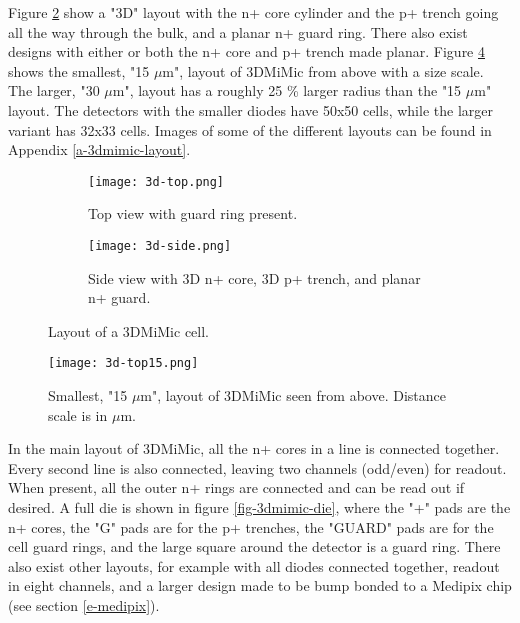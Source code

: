 \documentclass[../main/thesis.tex]{subfiles}
\begin{document}
Figure \ref{fig-3dmimic-side} show a "3D" layout with the n+ core cylinder and the p+ trench going all the way through the bulk, and a planar n+ guard ring. There also exist designs with either or both the n+ core and p+ trench made planar. Figure \ref{fig-3dmimic-top15} shows the smallest, "15 $\mu$m", layout of 3DMiMic from above with a size scale. The larger, "30 $\mu$m", layout has a roughly 25 \% larger radius than the "15 $\mu$m" layout. The detectors with the smaller diodes have 50x50 cells, while the larger variant has 32x33 cells. Images of some of the different layouts can be found in Appendix \ref{a-3dmimic-layout}.



\begin{figure}
	\centering
	\begin{subfigure}{.5\textwidth}
		\centering
		\texttt{[image: 3d-top.png]}
		\caption{Top view with guard ring present.}
		\label{fig-3dmimic-top}
	\end{subfigure}%
	\begin{subfigure}{.5\textwidth}
		\centering
		\texttt{[image: 3d-side.png]}
		\caption{Side view with 3D n+ core, 3D p+ trench, and planar n+ guard.}
		\label{fig-3dmimic-side} %
	\end{subfigure}
	\caption{Layout of a 3DMiMic cell. \citep{Marco}}
	\label{fig-3dmimic-top-side}
\end{figure}


\begin{figure}[h]
	\centering
	\texttt{[image: 3d-top15.png]}
	\caption{Smallest, "15 $\mu$m", layout of 3DMiMic seen from above. Distance scale is in $\mu$m. \citep{Marco}}
	\label{fig-3dmimic-top15} %
\end{figure}

In the main layout of 3DMiMic, all the n+ cores in a line is connected together. Every second line is also connected, leaving two channels (odd/even) for readout. When present, all the outer n+ rings are connected and can be read out if desired. A full die is shown in figure \ref{fig-3dmimic-die}, where the "+" pads are the n+ cores, the "G" pads are for the p+ trenches, the "GUARD" pads are for the cell guard rings, and the large square around the detector is a guard ring. There also exist other layouts, for example with all diodes connected together, readout in eight channels, and a larger design made to be bump bonded to a Medipix chip (see section \ref{e-medipix}). 
\end{document}
